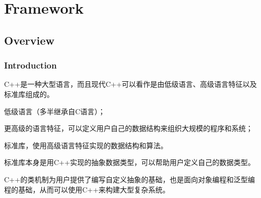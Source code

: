 \part{Framework}


\chapter{Overview}


\section{Introduction}


C++是一种大型语言，而且现代C++可以看作是由低级语言、高级语言特征以及标准库组成的。

\begin{compactitem}
\item 低级语言（多半继承自C语言）；
\item 更高级的语言特征，可以定义用户自己的数据结构来组织大规模的程序和系统；
\item 标准库，使用高级语言特征实现的数据结构和算法。
\end{compactitem}

标准库本身是用C++实现的抽象数据类型，可以帮助用户定义自己的数据类型。


C++的类机制为用户提供了编写自定义抽象的基础，也是面向对象编程和泛型编程的基础，从而可以使用C++来构建大型复杂系统。















































